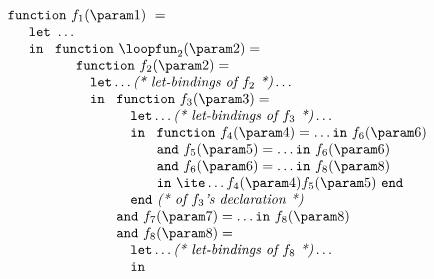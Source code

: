 \begin{equation}
\label{FunctionalLoopNest2}
\begin{array}{l}
\mathtt{function}\ f_1(\param 1)\ = \\
  \quad
  \begin{array}{l}
     \mathtt{let}\ \ldots  \\
     \mathtt{in}\ 
     \begin{array}[t]{l}
       \mathtt{function}\ \loopfun_2 (\param 2) =  \\
       \quad \begin{array}[t]{l}
               \mathtt{function}\ f_2(\param 2) = \\
               \quad \mathtt{let} \ldots \textit{(* let-bindings of $f_2$ *)} \ldots\\
               \quad \mathtt{in}\ 
                       \begin{array}[t]{l} 
                         \mathtt{function}\ f_3(\param 3) = \\
                         \quad \mathtt{let} \ldots \textit{(* let-bindings of $f_3$ *)} \ldots\\
                         \quad \mathtt{in}\ 
                               \begin{array}[t]{l}
                                 \mathtt{function}\ f_4(\param 4) = \ldots \mathtt{in}\ f_6(\param 6)\\
                                 \mathtt{and}\ f_5(\param 5) = \ldots \mathtt{in}\ f_6(\param 6)\\
                                 \mathtt{and}\ f_6(\param 6) = \ldots \mathtt{in}\ f_8(\param 8)\\
                                 \mathtt{in}\ \ite \ldots {f_4(\param 4)} {f_5(\param 5)}\ \mathtt{end}
                               \end{array}\\
                         \quad \mathtt{end}\ \textit{(* of $f_3$'s declaration *)}\\
                         \mathtt{and}\ f_7(\param 7) = \ldots \mathtt{in}\ f_8(\param 8)\\
                         \mathtt{and}\ f_8(\param 8) = \\
                         \quad \mathtt{let} \ldots \textit{(* let-bindings of $f_8$ *)} \ldots\\
                         \quad \mathtt{in}\ 
                               \begin{array}[t]{l}

\end{array}
\end{array}
\end{array}
\end{array}
\end{array}
\end{array}
\end{equation}
